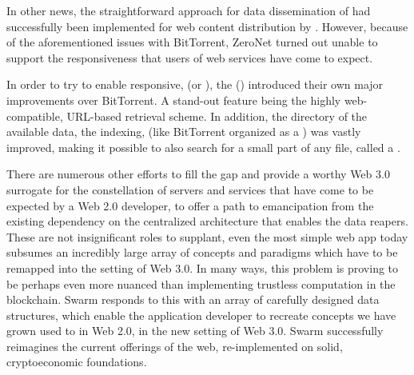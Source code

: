 In other news, the straightforward approach for data dissemination of  had successfully been implemented for web content distribution by  \cite{zeronet}. However, because of the aforementioned issues with BitTorrent, ZeroNet turned out unable to support the responsiveness that users of web services have come to expect.

In order to try to enable responsive,  (or ), the  () \cite{ipfs2014}  introduced their own major improvements over BitTorrent. A stand-out feature being the highly web-compatible, URL-based retrieval scheme. In addition, the directory of the available data, the indexing, (like BitTorrent organized as a ) was vastly improved, making it possible to also search for a small part of any file, called a .

There are numerous other efforts to fill the gap and provide a worthy Web 3.0 surrogate for the constellation of servers and services that have come to be expected by a Web 2.0 developer, to offer a path to emancipation from the existing dependency on the centralized architecture that enables the data reapers. These are not insignificant roles to supplant, even the most simple web app today subsumes an incredibly large array of concepts and paradigms which have to be remapped into the  setting of Web 3.0. In many ways, this problem is proving to be perhaps even more nuanced than implementing trustless computation in the blockchain. Swarm responds to this with an array of carefully designed data structures, which enable the application developer to recreate concepts we have grown used to in Web 2.0, in the new setting of Web 3.0. Swarm successfully reimagines the current offerings of the web, re-implemented on solid, cryptoeconomic foundations.

